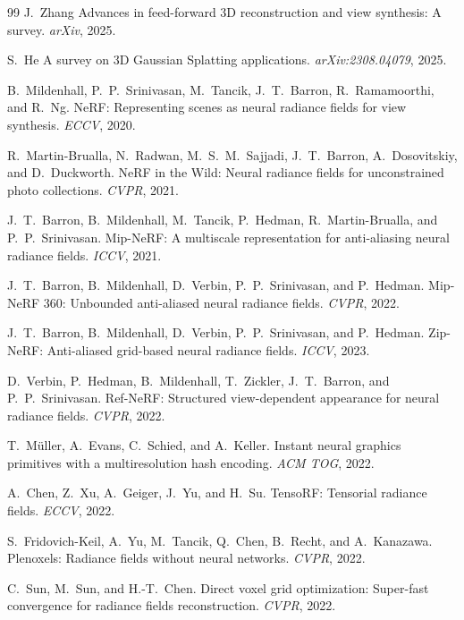 \begin{thebibliography}{99}
J.~Zhang \etal
Advances in feed-forward 3D reconstruction and view synthesis: A survey.
\emph{arXiv}, 2025.


S.~He \etal
A survey on 3D Gaussian Splatting applications.
\emph{arXiv:2308.04079}, 2025.


B.~Mildenhall, P.~P.~Srinivasan, M.~Tancik, J.~T.~Barron, R.~Ramamoorthi,
and R.~Ng.
NeRF: Representing scenes as neural radiance fields for view synthesis.
\emph{ECCV}, 2020.


R.~Martin-Brualla, N.~Radwan, M.~S.~M.~Sajjadi, J.~T.~Barron, A.~Dosovitskiy,
and D.~Duckworth.
NeRF in the Wild: Neural radiance fields for unconstrained photo collections.
\emph{CVPR}, 2021.


J.~T.~Barron, B.~Mildenhall, M.~Tancik, P.~Hedman, R.~Martin-Brualla, and
P.~P.~Srinivasan.
Mip-NeRF: A multiscale representation for anti-aliasing neural radiance fields.
\emph{ICCV}, 2021.


J.~T.~Barron, B.~Mildenhall, D.~Verbin, P.~P.~Srinivasan, and P.~Hedman.
Mip-NeRF 360: Unbounded anti-aliased neural radiance fields.
\emph{CVPR}, 2022.


J.~T.~Barron, B.~Mildenhall, D.~Verbin, P.~P.~Srinivasan, and P.~Hedman.
Zip-NeRF: Anti-aliased grid-based neural radiance fields.
\emph{ICCV}, 2023.


D.~Verbin, P.~Hedman, B.~Mildenhall, T.~Zickler, J.~T.~Barron, and
P.~P.~Srinivasan.
Ref-NeRF: Structured view-dependent appearance for neural radiance fields.
\emph{CVPR}, 2022.


T.~M\"{u}ller, A.~Evans, C.~Schied, and A.~Keller.
Instant neural graphics primitives with a multiresolution hash encoding.
\emph{ACM TOG}, 2022.


A.~Chen, Z.~Xu, A.~Geiger, J.~Yu, and H.~Su.
TensoRF: Tensorial radiance fields.
\emph{ECCV}, 2022.


S.~Fridovich-Keil, A.~Yu, M.~Tancik, Q.~Chen, B.~Recht, and A.~Kanazawa.
Plenoxels: Radiance fields without neural networks.
\emph{CVPR}, 2022.


C.~Sun, M.~Sun, and H.-T.~Chen.
Direct voxel grid optimization: Super-fast convergence for radiance fields
reconstruction.
\emph{CVPR}, 2022.



\end{thebibliography}
